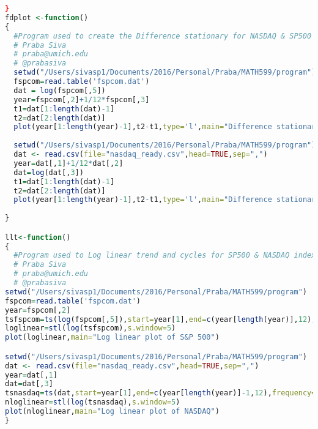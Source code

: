 \begin{lstlisting}[basicstyle=\tiny,language=R]
}
fdplot <-function()
{
  #Program used to create the Difference stationary for NASDAQ & SP500 indexes
  # Praba Siva
  # praba@umich.edu
  # @prabasiva
  setwd("/Users/sivasp1/Documents/2016/Personal/Praba/MATH599/program")
  fspcom=read.table('fspcom.dat')
  dat = log(fspcom[,5])
  year=fspcom[,2]+1/12*fspcom[,3]
  t1=dat[1:length(dat)-1]
  t2=dat[2:length(dat)]
  plot(year[1:length(year)-1],t2-t1,type='l',main="Difference stationary of first Differencing of log(x(t))\nx(t) = S&P 500", xlab="Year",ylab="FD",col=2,ylim=c(-.2,.2)) 
  
  setwd("/Users/sivasp1/Documents/2016/Personal/Praba/MATH599/program")
  dat <- read.csv(file="nasdaq_ready.csv",head=TRUE,sep=",")
  year=dat[,1]+1/12*dat[,2]
  dat=log(dat[,3])
  t1=dat[1:length(dat)-1]
  t2=dat[2:length(dat)]
  plot(year[1:length(year)-1],t2-t1,type='l',main="Difference stationary of first Differencing of log(x(t))\nx(t) = NASDAQ", xlab="Year",ylab="FD",col=3,ylim=c(-.2,.2)) 
  
}

llt<-function()
{
  #Program used to Log linear trend and cycles for SP500 & NASDAQ index
  # Praba Siva
  # praba@umich.edu
  # @prabasiva
setwd("/Users/sivasp1/Documents/2016/Personal/Praba/MATH599/program")
fspcom=read.table('fspcom.dat')
year=fspcom[,2]
tsfspcom=ts(log(fspcom[,5]),start=year[1],end=c(year[length(year)],12),frequency=12)
loglinear=stl(log(tsfspcom),s.window=5)
plot(loglinear,main="Log linear plot of S&P 500")

setwd("/Users/sivasp1/Documents/2016/Personal/Praba/MATH599/program")
dat <- read.csv(file="nasdaq_ready.csv",head=TRUE,sep=",")
year=dat[,1]
dat=dat[,3]
tsnasdaq=ts(dat,start=year[1],end=c(year[length(year)]-1,12),frequency=12)
nloglinear=stl(log(tsnasdaq),s.window=5)
plot(nloglinear,main="Log linear plot of NASDAQ")
}



\end{lstlisting}
\begin{lstlisting}[basicstyle=\tiny,language=MATLAB]


\end{lstlisting}
